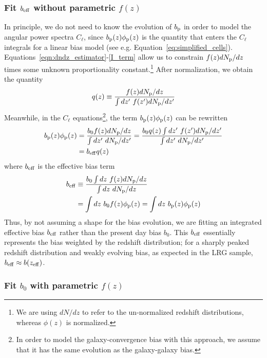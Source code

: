 \subsubsection{Fit $b_{\rm eff}$ without parametric $f(z)$}\label{sec:dndz_pipe/q}

In principle, we do not need to know the evolution of $b_{\rm p}$ in order to model the angular power spectra $C_{\ell}$, since $b_{\rm p}(z)\phi_{\rm p}(z)$ is the quantity that enters the $C_{\ell}$ integrals for a linear bias model (see e.g. Equation~\ref{eq:simplified_cells}). Equations~\ref{eqn:dndz_estimator}-\ref{I_term} allow us to constrain $f(z)dN_{\rm p}/dz$ times some unknown proportionality constant.\footnote{We are using $dN/dz$ to refer to the un-normalized redshift distributions, whereas $\phi(z)$ is normalized.} After normalization, we obtain the quantity
%
\begin{equation}
q(z) \equiv \frac{f(z)dN_{\rm p}/dz}{\int dz^{\prime} \ f(z^{\prime})dN_{\rm p}/dz^{\prime}}
\end{equation}
%
Meanwhile, in the $C_{\ell}$ equations\footnote{In order to model the galaxy-convergence bias with this approach, we assume that it has the same evolution as the galaxy-galaxy bias.}, the term $b_{\rm p}(z)\phi_{\rm p}(z)$ can be rewritten 
%
\begin{align}
    b_{\rm p}(z)\phi_{\rm p}(z) &= \frac{b_0 f(z) dN_{\rm p}/dz}{\int dz^{\prime} \ dN_{\rm p}/dz^{\prime}} = \frac{b_0 q(z) \int dz^{\prime} \ f(z^{\prime})dN_{\rm p}/dz^{\prime}}{\int dz^{\prime} \ dN_{\rm p}/dz^{\prime}} \\
    &= b_{\rm eff}q(z)
\end{align}
%
where $b_{\rm eff}$ is the effective bias term
\begin{align}
    b_{\rm eff} &\equiv \frac{b_0\int dz \ f(z)dN_{\rm p}/dz}{\int dz \  dN_{\rm p}/dz} \\
    &= \int dz \ b_0 f(z) \phi_{\rm p}(z) = \int dz \ b_{\rm p}(z) \phi_{\rm p}(z)
\end{align}
Thus, by not assuming a shape for the bias evolution, we are fitting an integrated effective bias $b_{\rm eff}$ rather than the present day bias $b_0$. This $b_{\rm eff}$ essentially represents the bias weighted by the redshift distribution; for a sharply peaked redshift distribution and weakly evolving bias, as expected in the LRG sample, $b_{\rm eff} \approx b(z_{\rm eff})$.

\subsubsection{Fit $b_0$ with parametric $f(z)$}

